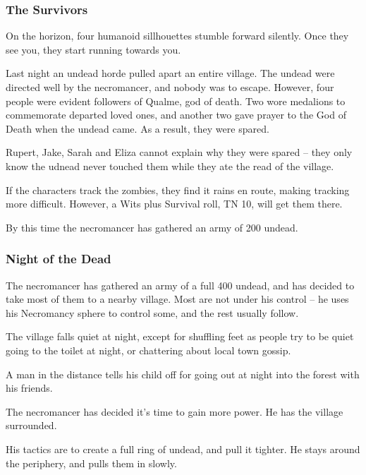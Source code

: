 \subsubsection{The Survivors}

\begin{boxtext}
	On the horizon, four humanoid sillhouettes stumble forward silently.  Once they see you, they start running towards you.
\end{boxtext}

Last night an undead horde pulled apart an entire village.  The undead were directed well by the necromancer, and nobody was to escape.  However, four people were evident followers of Qualme, god of death.  Two wore medalions to commemorate departed loved ones, and another two gave prayer to the God of Death when the undead came.  As a result, they were spared.

Rupert, Jake, Sarah and Eliza cannot explain why they were spared -- they only know the udnead never touched them while they ate the read of the village.

If the characters track the zombies, they find it rains en route, making tracking more difficult.  However, a Wits plus Survival roll, TN 10, will get them there.

By this time the necromancer has gathered an army of 200 undead.

\subsubsection{Night of the Dead}

The necromancer has gathered an army of a full 400 undead, and has decided to take most of them to a nearby village.  Most are not under his control -- he uses his Necromancy sphere to control some, and the rest usually follow.

\begin{boxtext}
	The village falls quiet at night, except for shuffling feet as people try to be quiet going to the toilet at night, or chattering about local town gossip.

	A man in the distance tells his child off for going out at night into the forest with his friends.
\end{boxtext}

The necromancer has decided it's time to gain more power.  He has the village surrounded.

His tactics are to create a full ring of undead, and pull it tighter.  He stays around the periphery, and pulls them in slowly.

